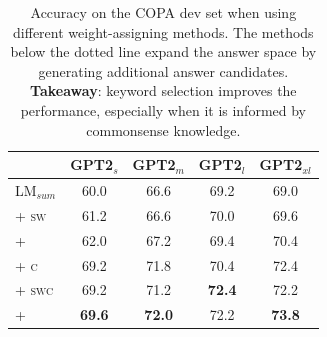 \begin{table}[t]
\centering
\small
\begin{tabular}{lcccc}
\toprule
& GPT2$_{s}$& GPT2$_{m}$& GPT2$_{l}$& GPT2$_{xl}$\\
\midrule
LM$_{sum}$ & 60.0 & 66.6 & 69.2 & 69.0\\
\quad + \textsc{sw} & 61.2 & 66.6 & 70.0 & 69.6\\
\quad + \methodnoc{} & 62.0 & 67.2 & 69.4 & 70.4\\
\hdashline
\quad + \textsc{c} & 69.2 & 71.8 & 70.4 & 72.4 \\
\quad + \textsc{swc} & 69.2 & 71.2 & \textbf{72.4} & 72.2\\
\quad + \method{} & \textbf{69.6} & \textbf{72.0} & 72.2 & \textbf{73.8}\\
\midrule
\end{tabular}
\caption{Accuracy on the COPA dev set when using different weight-assigning methods. The methods below the dotted line expand the answer space by generating additional answer candidates. \textbf{Takeaway}: keyword selection improves the performance, especially when it is informed by commonsense knowledge.}
\label{tab:weighting}
\end{table}